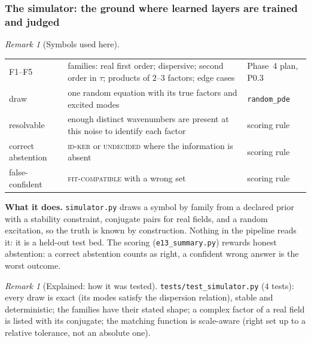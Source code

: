 \documentclass[11pt]{article}
\theoremstyle{plain}
\theoremstyle{definition}
\theoremstyle{remark}
\newtheorem{remark}[theorem]{Remark}
\newenvironment{explained}[1]{\begin{remark}[Explained: #1]}{\end{remark}}
\newenvironment{symbols}{\begin{remark}[Symbols used here]}{\end{remark}}
\begin{document}
\subsubsection{The simulator: the ground where learned layers are trained and judged}\label{sec:sim}
\begin{symbols}
\begin{tabular}{@{}L{2.6cm}L{6.0cm}L{4.3cm}@{}}
F1--F5 & families: real first order; dispersive; second order in $\tau$; products of $2$--$3$ factors; edge cases & Phase~4 plan, P0.3\\
draw & one random equation with its true factors and excited modes & \texttt{random\_pde}\\
resolvable & enough distinct wavenumbers are present at this noise to identify each factor & scoring rule\\
correct abstention & \textsc{id-ker} or \textsc{undecided} where the information is absent & scoring rule\\
false-confident & \textsc{fit-compatible} with a wrong set & scoring rule\\
\end{tabular}
\end{symbols}
\textbf{What it does.} \texttt{simulator.py} draws a symbol by family from a declared prior with a stability constraint, conjugate pairs for real fields, and a random excitation, so the truth is known by construction. Nothing in the pipeline reads it: it is a held-out test bed. The scoring (\texttt{e13\_summary.py}) rewards honest abstention: a correct abstention counts as right, a confident wrong answer is the worst outcome.

\begin{explained}{how it was tested}
\texttt{tests/test\_simulator.py} ($4$ tests): every draw is exact (its modes satisfy the dispersion relation), stable and deterministic; the families have their stated shape; a complex factor of a real field is listed with its conjugate; the matching function is scale-aware (right set up to a relative tolerance, not an absolute one).
\end{explained}
\end{document}

